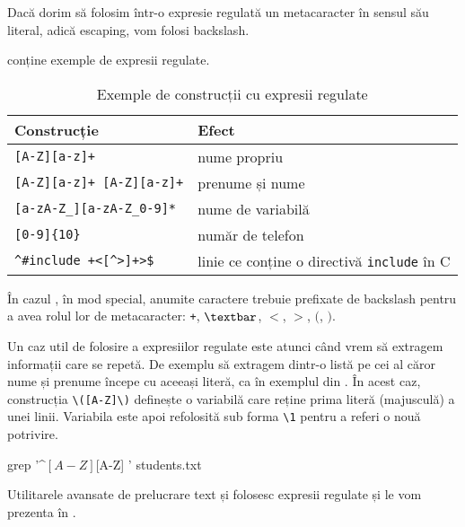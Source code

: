 Dacă dorim să folosim într-o expresie regulată un metacaracter în sensul său literal, adică escaping, vom folosi backslash.

 conține exemple de expresii regulate.

\begin{table}[!htb]
  \begin{center}
    \begin{tabular}{ p{} p{} }
      \toprule
        \textbf{Construcție} &
        \textbf{Efect} \\
      \midrule
        \verb|[A-Z][a-z]+| &
        nume propriu \\
      \midrule
        \verb|[A-Z][a-z]+ [A-Z][a-z]+| &
        prenume și nume \\
      \midrule
        \verb|[a-zA-Z_][a-zA-Z_0-9]*| &
        nume de variabilă \\
      \midrule
        \verb|[0-9]{10}| &
        număr de telefon \\
      \midrule
        \verb|^#include +<[^>]+>$| &
        linie ce conține o directivă \texttt{include} în C \\
      \bottomrule
    \end{tabular}
  \end{center}
  \caption{Exemple de construcții cu expresii regulate}
  \label{tab:cli:regex-example}
\end{table}

În cazul , în mod special, anumite caractere trebuie prefixate de backslash
pentru a avea rolul lor de metacaracter: \texttt{+}, \texttt{$\textbar$}, \texttt{$<$}, \texttt{$>$}, \texttt{$($}, \texttt{$)$}.

Un caz util de folosire a expresiilor regulate este atunci când vrem să extragem
informații care se repetă. De exemplu să extragem dintr-o listă pe cei al căror
nume și prenume începe cu aceeași literă, ca în exemplul din . În acest caz, construcția \verb|\([A-Z]\)| definește o variabilă care reține prima literă (majusculă) a unei linii. Variabila este apoi refolosită sub forma \verb|\1| pentru a referi o nouă potrivire.

\begin{screen}[caption={Expresii regulate cu variabile},escapechar=,label={lst:cli:regex-var}]
grep '^\([A-Z]\)[A-Z]\+ \1' students.txt
\end{screen}

Utilitarele avansate de prelucrare text  și  folosesc expresii regulate și
le vom prezenta în .

